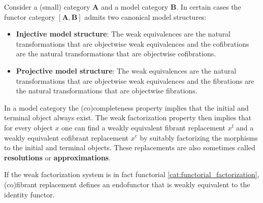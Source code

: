     \begin{property}\label{model:model_functor_category}
        Consider a (small) category $\mathbf{A}$ and a model category $\mathbf{B}$. In certain cases the functor category $[\mathbf{A},\mathbf{B}]$ admits two canonical model structures:
        \begin{itemize}
            \item\textbf{Injective model structure}: The weak equivalences are the natural transformations that are objectwise weak equivalences and the cofibrations are the natural transformations that are objectwise cofibrations.
            \item\textbf{Projective model structure}: The weak equivalences are the natural transformations that are objectwise weak equivalences and the fibrations are the natural transformations that are objectwise fibrations.
        \end{itemize}
    \end{property}

    \begin{property}[Resolution]
        In a model category the (co)completeness property implies that the initial and terminal object always exist. The weak factorization property then implies that for every object $x$ one can find a weakly equivalent fibrant replacement $x^{\mathrm{f}}$ and a weakly equivalent cofibrant replacement $x^{\mathrm{c}}$ by suitably factorizing the morphisms to the initial and terminal objects. These replacements are also sometimes called \textbf{resolutions} or \textbf{approximations}.

        If the weak factorization system is in fact functorial \ref{cat:functorial_factorization}, (co)fibrant replacement defines an endofunctor that is weakly equivalent to the identity functor.
    \end{property}

